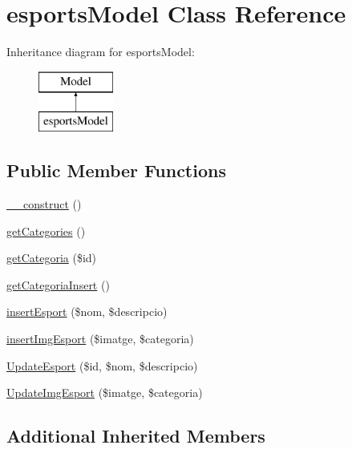 \hypertarget{classesports_model}{}\section{esports\+Model Class Reference}
\label{classesports_model}
Inheritance diagram for esports\+Model\+:\begin{figure}[H]
\begin{center}
\leavevmode
\includegraphics[height=2.000000cm]{classesports_model}
\end{center}
\end{figure}
\subsection*{Public Member Functions}
\begin{DoxyCompactItemize}
\item 
\hyperlink{classesports_model_a095c5d389db211932136b53f25f39685}{\+\_\+\+\_\+construct} ()
\item 
\hyperlink{classesports_model_a8729ba486702e7e12a3fff08965e1e7f}{get\+Categories} ()
\item 
\hyperlink{classesports_model_a0508470fbde65a743da5fa1c91d3d340}{get\+Categoria} (\$id)
\item 
\hyperlink{classesports_model_a09c6a525fe1358d3739bff55d6b2664d}{get\+Categoria\+Insert} ()
\item 
\hyperlink{classesports_model_ab413e94f42cb2c09b445ee4daec9c452}{insert\+Esport} (\$nom, \$descripcio)
\item 
\hyperlink{classesports_model_afe063eef39b8f717aa3be537b0a30e4f}{insert\+Img\+Esport} (\$imatge, \$categoria)
\item 
\hyperlink{classesports_model_a8807932a18adaed1aa4b99f284917d95}{Update\+Esport} (\$id, \$nom, \$descripcio)
\item 
\hyperlink{classesports_model_a5f534a9b210bbb5919a3a1703825e8e6}{Update\+Img\+Esport} (\$imatge, \$categoria)
\end{DoxyCompactItemize}
\subsection*{Additional Inherited Members}



